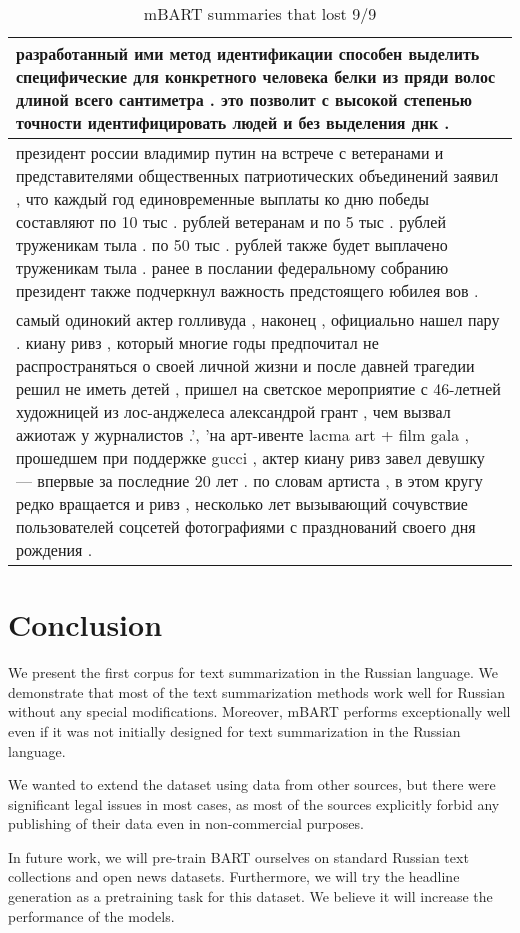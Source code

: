 \documentclass[runningheads]{llncs}
\begin{document}
\begin{table}
\caption{mBART summaries that lost 9/9}\label{tab6}
\centering
\begin{tabular}{ | p{11.7cm} |}
\hline
разработанный ими метод идентификации способен выделить специфические для конкретного человека белки из пряди волос длиной всего сантиметра . это позволит с высокой степенью точности идентифицировать людей и без выделения днк .\\
\hline
\hline
\hline
президент россии владимир путин на встрече с ветеранами и представителями общественных патриотических объединений заявил , что каждый год единовременные выплаты ко дню победы составляют по 10 тыс . рублей ветеранам и по 5 тыс . рублей труженикам тыла . по 50 тыс . рублей также будет выплачено труженикам тыла . ранее в послании федеральному собранию президент также подчеркнул важность предстоящего юбилея вов .\\
\hline
\hline
\hline
самый одинокий актер голливуда , наконец , официально нашел пару . киану ривз , который многие годы предпочитал не распространяться о своей личной жизни и после давней трагедии решил не иметь детей , пришел на светское мероприятие с 46-летней художницей из лос-анджелеса александрой грант , чем вызвал ажиотаж у журналистов .', 'на арт-ивенте lacma art + film gala , прошедшем при поддержке gucci , актер киану ривз завел девушку — впервые за последние 20 лет . по словам артиста , в этом кругу редко вращается и ривз , несколько лет вызывающий сочувствие пользователей соцсетей фотографиями с празднований своего дня рождения .\\
\hline
\end{tabular}
\end{table}

\section{Conclusion}
We present the first corpus for text summarization in the Russian language. We demonstrate that most of the text summarization methods work well for Russian without any special modifications. Moreover, mBART performs exceptionally well even if it was not initially designed for text summarization in the Russian language.

We wanted to extend the dataset using data from other sources, but there were significant legal issues in most cases, as most of the sources explicitly forbid any publishing of their data even in non-commercial purposes.

In future work, we will pre-train BART ourselves on standard Russian text collections and open news datasets. Furthermore, we will try the headline generation as a pretraining task for this dataset. We believe it will increase the performance of the models.
\end{document}
